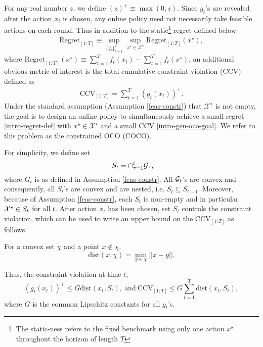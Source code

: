 
For any real number $z$, we define $(z)^+ \equiv \max(0,z).$ Since $g_{t}$'s are revealed after the action $x_t$ is chosen, any online policy need not necessarily take feasible actions on each round. 
 Thus in addition to the static\footnote{ The static-ness refers to the fixed benchmark using only one action $x^\star$ throughout the horizon of length $T$}  regret defined below
\begin{eqnarray} \label{regret-def}
	\textrm{Regret}_{[1:T]} \equiv \sup_{\{f_t\}_{t=1}^T} \sup_{x^\star \in \mathcal{X}^\star} \textrm{Regret}_{[1:T]}(x^\star), \end{eqnarray}
	where $\textrm{Regret}_{[1:T]}(x^\star) \equiv \sum_{t=1}^T f_t(x_t) - \sum_{t=1}^T f_t(x^\star)$, 
an additional obvious metric of interest is  the total cumulative constraint violation (CCV) defined as 
  \begin{eqnarray} \label{gen-oco-goal}
 	\textrm{CCV}_{[1:T]}  = \sum_{t=1}^T (g_{t}(x_t))^+. 
	\end{eqnarray}
	 Under the standard assumption (Assumption \ref{feas-constr}) that $\mathcal{X}^\star$ is not empty, the goal is to design an online policy to simultaneously achieve a small regret \eqref{intro-regret-def} with $x^\star \in \mathcal{X}^\star$ and a small CCV \eqref{intro-gen-oco-goal}. We refer to this problem as the constrained OCO (COCO). 
	 
For simplicity, we define set 
\begin{equation}\label{defn:S}
 \ S_t = \cap_{\tau=1}^t {\cal G}_\tau,
\end{equation}
where $G_t$ is as defined in Assumption \ref{feas-constr}.
All ${\cal G}_t$'s are convex and consequently, all $S_t$'s are convex and are nested, i.e. $S_t\subseteq S_{t-1}$. Moreover, because of Assumption \ref{feas-constr},  each $S_t$ is non-empty and in particular $\mathcal{X}^\star\in S_t$ for all $t$. After action $x_t$ has been chosen, set $S_t$ controls the constraint violation, which can be used to write an upper bound on the $\textrm{CCV}_{[1:T]}$ as follows.

\begin{definition}
For a convex set $\chi$ and a point $x\notin \chi$, 
$$\text{dist}(x,\chi) = \min_{y\in \chi} || x-y||.$$
\end{definition}

Thus, the constraint violation at time $t$, 
\begin{equation}\label{eq:distviolationrelation}
(g_t(x_t))^+ \le G\text{dist}(x_t,S_t), \ \text{and} \  \textrm{CCV}_{[1:T]}  \le G\sum_{t=1}^T \text{dist}(x_t,S_t),
\end{equation}
where $G$ is the common Lipschitz constants for all $g_t$'s.


	 
	 